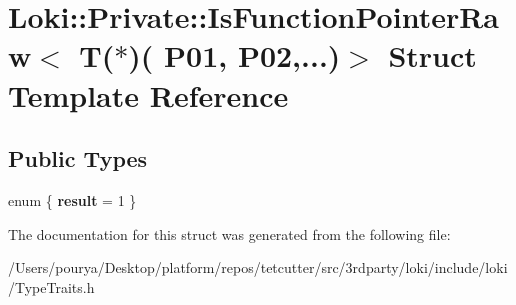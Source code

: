 \hypertarget{structLoki_1_1Private_1_1IsFunctionPointerRaw_3_01T_07_5_08_07_01_01_01_01_01_01_01_01_01_01_01_7f5ff37708e89cf10639a54fb3bb68f6}{}\section{Loki\+:\+:Private\+:\+:Is\+Function\+Pointer\+Raw$<$ T($\ast$)( P01, P02,...)$>$ Struct Template Reference}
\label{structLoki_1_1Private_1_1IsFunctionPointerRaw_3_01T_07_5_08_07_01_01_01_01_01_01_01_01_01_01_01_7f5ff37708e89cf10639a54fb3bb68f6}
\subsection*{Public Types}
\begin{DoxyCompactItemize}
\item 
\hypertarget{structLoki_1_1Private_1_1IsFunctionPointerRaw_3_01T_07_5_08_07_01_01_01_01_01_01_01_01_01_01_01_7f5ff37708e89cf10639a54fb3bb68f6_a9704a3a4242f2fcbd364637da23cde4c}{}enum \{ {\bfseries result} = 1
 \}\label{structLoki_1_1Private_1_1IsFunctionPointerRaw_3_01T_07_5_08_07_01_01_01_01_01_01_01_01_01_01_01_7f5ff37708e89cf10639a54fb3bb68f6_a9704a3a4242f2fcbd364637da23cde4c}

\end{DoxyCompactItemize}


The documentation for this struct was generated from the following file\+:\begin{DoxyCompactItemize}
\item 
/\+Users/pourya/\+Desktop/platform/repos/tetcutter/src/3rdparty/loki/include/loki/Type\+Traits.\+h\end{DoxyCompactItemize}
